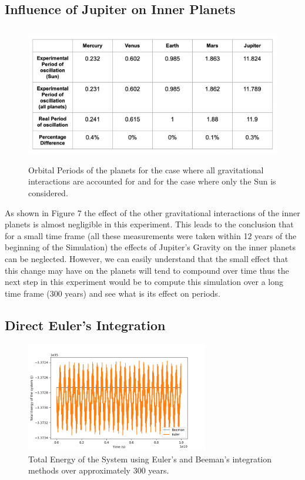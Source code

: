 \documentclass{article}
\begin{document}
\subsection{Influence of Jupiter on Inner Planets}

\begin{figure}[H]
    \centering
    \includegraphics[width=12.614cm, height=6.006cm]{Sun Only.png}
    \caption{Orbital Periods of the planets for the case where all gravitational interactions are accounted for and for the case where only the Sun is considered.}
    \label{fig:my_label}
\end{figure}

{As shown in Figure 7 the effect of the other gravitational interactions of the inner planets is almost negligible in this experiment. This leads to the conclusion that for a small time frame (all these measurements were taken within 12 years of the beginning of the Simulation) the effects of Jupiter's Gravity on the inner planets can be neglected. However, we can easily understand that the small effect that this change may have on the planets will tend to compound over time thus the next step in this experiment would be to compute this simulation over a long time frame (300 years) and see what is its effect on periods.}

\subsection{Direct Euler’s Integration}

\begin{figure}[H]
    \centering
    \includegraphics[width=7.96cm, height=4.80cm]{Euler Vs Beeman.png}
    \caption{Total Energy of the System using Euler's and Beeman's integration methods over approximately 300 years. }
    \label{fig:my_label}
\end{figure}
\end{document}
